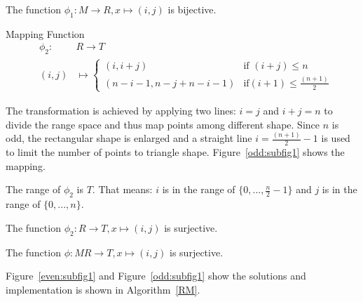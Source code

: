 \documentclass[AMA,LATO1COL]{WileyNJD-v2}
\begin{document}
\vspace{5mm}
\begin{lemma}
The function $\phi_1:   M \rightarrow  R,x \mapsto (i,j)$ is bijective.
\end{lemma}
\vspace{5mm}
\begin{definition}
Mapping Function
\begin{eqnarray}
&\phi_2:& R\rightarrow T\\
&(i,j)&\mapsto
  \begin{cases}
   (i,i+j) &\text {if } (i+j) \leq n \\
   (n-i-1,n-j+n-i-1) & \text {if}(i+1) \leq \frac{(n+1)}{2}
  \end{cases}
\end{eqnarray}
\end{definition}
The transformation is achieved by applying two lines: $i=j$ and $i+j=n$ to divide the range space and thus map points among different shape. Since $n$ is odd, the rectangular shape is enlarged and a straight line $i= \frac{(n+1)}{2}-1$ is used to limit the number of points to triangle shape. Figure~\ref{odd:subfig1} shows the mapping.
\vspace{5mm}
\begin{lemma}
The range of $\phi_2$ is $T$. That means: $i$ is in the range of  $\{0,...,\frac{n}{2}-1\}$ and $j$ is in the range of $\{0,...,n\}$.
\end{lemma}
\vspace{5mm}
\begin{lemma}
The function $\phi_2:   R \rightarrow  T,x \mapsto (i,j)$ is surjective.
\end{lemma}
\vspace{5mm}
\begin{corollary}
The function $\phi:   M  R \rightarrow  T,x \mapsto (i,j)$ is surjective.
\end{corollary}


Figure~\ref{even:subfig1} and Figure~\ref{odd:subfig1} show the solutions and implementation is shown in Algorithm~\ref{RM}.
\end{document}
